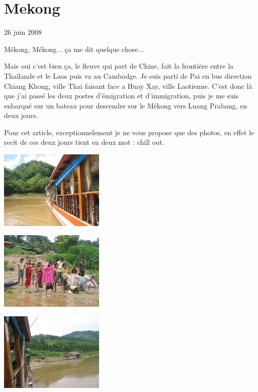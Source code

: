 \section{Mekong}

26 juin 2008

\begin{multicols}{2}

Mékong, Mékong... ça me dit quelque chose...

Mais oui c'est bien ça, le fleuve qui part de Chine, fait la frontière entre la Thaïlande et le Laos puis va au Cambodge. Je suis parti de Pai en bus direction Chiang Khong, ville Thai faisant face a Huay Xay, ville Laotienne. C'est donc là que j'ai passé les deux postes d'émigration et d'immigration, puis je me suis enbarqué sur un bateau pour descendre sur le Mékong vers Luang Prabang, en deux jours.

Pour cet article, exceptionnelement je ne vous propose que des photos, en effet le recit de ces deux jours tient en deux mot : chill out.

\smallbreak
\hspace*{-0.65cm}
\includegraphics[width=5cm]{articles/Mekong/1214473370zy1a.jpg}
\smallbreak

\smallbreak
\hspace*{-0.65cm}
\includegraphics[width=5cm]{articles/Mekong/12144733896AMi.jpg}
\smallbreak

\smallbreak
\hspace*{-0.65cm}
\includegraphics[width=5cm]{articles/Mekong/1214473395mtro.jpg}
\smallbreak


\end{multicols}
